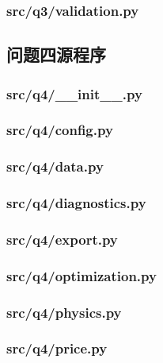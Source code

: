 \documentclass[zihao=-4,a4paper,UTF8,fontset=none]{ctexart}
\begin{document}
\subsubsection*{src/q3/validation.py}


\subsection{问题四源程序}
\subsubsection*{src/q4/\_\_init\_\_.py}


\subsubsection*{src/q4/config.py}


\subsubsection*{src/q4/data.py}


\subsubsection*{src/q4/diagnostics.py}


\subsubsection*{src/q4/export.py}


\subsubsection*{src/q4/optimization.py}


\subsubsection*{src/q4/physics.py}


\subsubsection*{src/q4/price.py}

\end{document}
